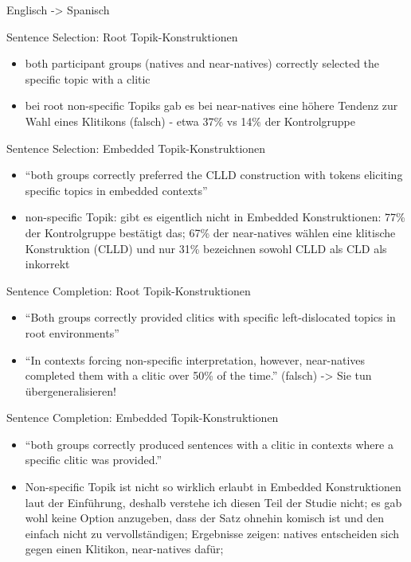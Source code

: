 Englisch -> Spanisch

Sentence Selection: Root Topik-Konstruktionen
\begin{itemize}
    \item both participant groups (natives and near-natives) correctly selected the specific topic with a clitic
    \item bei root non-specific Topiks gab es bei near-natives eine höhere Tendenz zur Wahl eines Klitikons (falsch) - etwa 37\% vs 14\% der Kontrolgruppe
\end{itemize}

Sentence Selection: Embedded Topik-Konstruktionen
\begin{itemize}
    \item ``both groups correctly preferred the CLLD construction with tokens eliciting specific topics in embedded contexts''
    \item non-specific Topik: gibt es eigentlich nicht in Embedded Konstruktionen: 77\% der Kontrolgruppe bestätigt das; 67\% der near-natives wählen eine klitische Konstruktion (CLLD) und nur 31\% bezeichnen sowohl CLLD als CLD als inkorrekt
\end{itemize}

Sentence Completion: Root Topik-Konstruktionen
\begin{itemize}
    \item ``Both groups correctly provided clitics with specific left-dislocated topics in root environments''
    \item ``In contexts forcing non-specific interpretation, however, near-natives completed them with a clitic over 50\% of the time.'' (falsch)
       -> Sie tun übergeneralisieren!

\end{itemize}

Sentence Completion: Embedded Topik-Konstruktionen
\begin{itemize}
    \item ``both groups correctly produced sentences with a clitic in contexts where a specific clitic was provided.''
    \item Non-specific Topik ist nicht so wirklich erlaubt in Embedded Konstruktionen laut der Einführung, deshalb verstehe ich diesen Teil der Studie nicht;
        es gab wohl keine Option anzugeben, dass der Satz ohnehin komisch ist und den einfach nicht zu vervollständigen;
        Ergebnisse zeigen: natives entscheiden sich gegen einen Klitikon, near-natives dafür;
\end{itemize}

